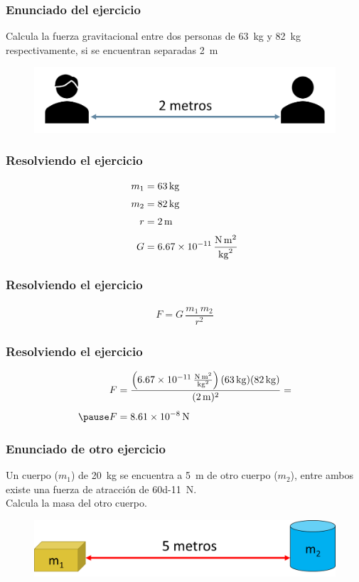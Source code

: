 \documentclass[14pt]{beamer}
\begin{document}
\begin{frame}
\frametitle{Enunciado del ejercicio}
Calcula la fuerza gravitacional entre dos personas de \SI{63}{\kilo\gram} y \SI{82}{\kilo\gram} respectivamente, si se encuentran separadas \SI{2}{\meter}
\begin{figure}
    \centering
    \includegraphics[scale=0.8]{Imagenes/Gravitacion_Universal_01.png}
\end{figure}
\end{frame}
\begin{frame}
\frametitle{Resolviendo el ejercicio}
\begin{align*}
m_{1} &= \SI{63}{\kilo\gram} \\[0.3em]
m_{2} &= \SI{82}{\kilo\gram} \\[0.3em]
r &= \SI{2}{\meter} \\[0.3em]
G &= \SI[per-mode=fraction]{6.67d-11}{\newton\square\meter\per\square\kilo\gram}
\end{align*}
\end{frame}
\begin{frame}
\frametitle{Resolviendo el ejercicio}
\pause
\begin{align*}
F = G \, \dfrac{m_{1} \, m_{2}}{r^{2}}
\end{align*}
\end{frame}
\begin{frame}
\frametitle{Resolviendo el ejercicio}
\pause
\begin{eqnarray*}
\begin{aligned}
F &= \dfrac{\left( \SI[per-mode=fraction]{6.67d-11}{\newton\square\meter\per\square\kilo\gram}\right)  (\SI{63}{\kilo\gram})(\SI{82}{\kilo\gram}) }{(\SI{2}{\meter})^{2}} = \\[0.5em] \pause
F &= \SI{8.61d-8}{\newton}
\end{aligned}
\end{eqnarray*}
\end{frame}
\begin{frame}
\frametitle{Enunciado de otro ejercicio}
Un cuerpo ($m_{1}$) de \SI{20}{\kilogram} se encuentra a \SI{5}{\meter} de otro cuerpo ($m_{2}$), entre ambos existe una fuerza de atracción de \SI{60d-11}{\newton}.
\\
\bigskip
\pause
Calcula la masa del otro cuerpo.
\begin{figure}
    \centering
    \includegraphics[scale=0.75]{Imagenes/Gravitacion_Universal_02.png}
\end{figure}
\end{frame}
\end{document}
